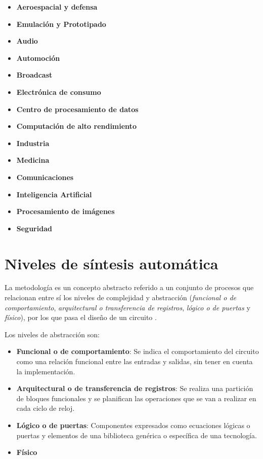 \begin{itemize}
    \item \textbf{Aeroespacial y defensa} 
    \item \textbf{Emulación y Prototipado}
    \item \textbf{Audio} 
    \item \textbf{Automoción} 
    \item \textbf{Broadcast} 
    \item \textbf{Electrónica de consumo} 
    \item \textbf{Centro de procesamiento de datos} 
    \item \textbf{Computación de alto rendimiento} 
    \item \textbf{Industria} 
    \item \textbf{Medicina} 
    \item \textbf{Comunicaciones}
    \item \textbf{Inteligencia Artificial}
    \item \textbf{Procesamiento de imágenes}
    \item \textbf{Seguridad}
\end{itemize}

\section{Niveles de síntesis automática}
La metodología es un concepto abstracto referido a un conjunto de procesos que relacionan entre sí los niveles de complejidad y abstracción 
(\textit{funcional o de comportamiento}, \textit{arquitectural o transferencia de registros}, \textit{lógico o de puertas} y 
\textit{físico}), por los que pasa el diseño de un circuito \cite{teres1997vhdl}.

Los niveles de abstracción son:

\begin{itemize}
    \item \textbf{Funcional o de comportamiento}: Se indica el comportamiento del circuito como una relación funcional entre las entradas 
    y salidas, sin tener en cuenta la implementación.
    \item \textbf{Arquitectural o de transferencia de registros}: Se realiza una partición de bloques funcionales y se planifican las 
    operaciones que se van a realizar en cada ciclo de reloj. 
    \item \textbf{Lógico o de puertas}: Componentes expresados como ecuaciones lógicas o puertas y elementos de una biblioteca genérica o 
    específica de una tecnología.
    \item \textbf{Físico}
\end{itemize}

